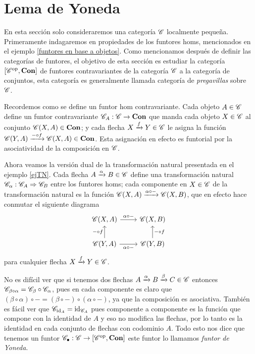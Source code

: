 \documentclass{comunicaciones}
\begin{document}
\section{Lema de Yoneda}

En esta sección solo consideraremos una categoría $\mathscr C$ localmente pequeña. Primeramente indagaremos en propiedades de los funtores homs, mencionados en el 
ejemplo \ref{funtores en base a objetos}. Como mencionamos después de definir las categorías de funtores, el objetivo de esta sección es estudiar la categoría
$[\mathscr C^{\mathrm{op}},\mathbf{Con}]$ de funtores contravariantes de la categoría $\mathscr C$ a la categoría de conjuntos, esta categoría es generalmente llamada categoría de \emph{pregavillas}
sobre $\mathscr C$. 

Recordemos como se define un funtor hom contravariante. Cada objeto $A\in\mathscr C$ define un funtor contravariante $\mathscr C_A:\mathscr C\to\mathbf{Con}$ que manda cada objeto $X\in\mathscr C$
al conjunto $\mathscr C(X,A)\in\mathbf{Con}$; y cada flecha $X\xrightarrow{f}Y\in\mathscr C$ le asigna la función $\mathscr C(Y,A)\xrightarrow{-\circ f}\mathscr C(X,A)\in\mathbf{Con}$. Esta asignación en efecto
es funtorial por la asociatividad de la composición en $\mathscr C$.

Ahora veamos la versión dual de la transformación natural presentada en el ejemplo \ref{ejTN}. Cada flecha $A\xrightarrow{\alpha}B\in\mathscr C$ define una transformación
natural $\mathscr C_\alpha:\mathscr C_A\Rightarrow\mathscr C_B$ entre los funtores homs; cada componente en $X\in\mathscr C$ de la transformación natural es la función $\mathscr C(X,A)\xrightarrow
{\alpha\circ -}\mathscr C(X,B)$, que en efecto hace conmutar el siguiente diagrama
\[\begin{tikzcd}
	{\C(X,A)} & {\C(X,B)} \\
	{\C(Y,A)} & {\C(Y,B)}
	\arrow["{\alpha\circ -}", from=1-1, to=1-2]
	\arrow["{-\circ f}", from=2-1, to=1-1]
	\arrow["{\alpha\circ -}"', from=2-1, to=2-2]
	\arrow["{-\circ f}"', from=2-2, to=1-2]
\end{tikzcd}\]
para cualquier flecha $X\xrightarrow{f}Y\in\mathscr C$.

No es difícil ver que si tenemos dos flechas $A\xrightarrow{\alpha}B\xrightarrow{\beta}C\in\mathscr C$ entonces $\mathscr C_{\beta\circ\alpha}=\mathscr C_\beta\circ\mathscr C_\alpha$, pues
en cada componente es claro que $(\beta\circ\alpha)\circ -=(\beta\circ -)\circ(\alpha\circ -)$, ya que la composición es asociativa. También es fácil ver que
$\mathscr C_{\mathrm{id}_A}=\mathrm{id}_{\mathscr C_A}$ pues componente a componente es la función que compone con la identidad de $A$ y eso no modifica las flechas, por lo tanto es la identidad
en cada conjunto de flechas con codominio $A$. Todo esto nos dice que tenemos un funtor $\mathscr C_\bullet:\mathscr C\to[\mathscr C^{\mathrm{op}},\mathbf{Con}]$ este funtor lo llamamos 
\emph{funtor de Yoneda}.
\end{document}
